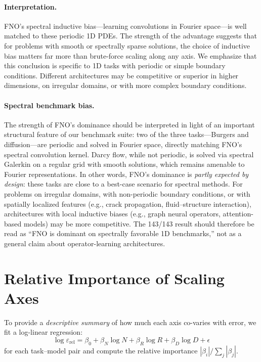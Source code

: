 \documentclass[11pt]{article}
\newcommand{\relLtwo}{\varepsilon_{\mathrm{rel}}}
\begin{document}
\paragraph{Interpretation.}
FNO's spectral inductive bias---learning convolutions in Fourier
space---is well matched to these periodic 1D PDEs. The strength of
the advantage suggests that for problems with smooth or spectrally
sparse solutions, the choice of inductive bias matters far more than
brute-force scaling along any axis.
We emphasize that this conclusion is specific to 1D tasks with
periodic or simple boundary conditions. Different architectures may
be competitive or superior in higher dimensions, on irregular
domains, or with more complex boundary conditions.

\paragraph{Spectral benchmark bias.}
\label{sec:spectral-bias}
The strength of FNO's dominance should be interpreted in light of an
important structural feature of our benchmark suite: two of the three
tasks---Burgers and diffusion---are periodic and solved in Fourier
space, directly matching FNO's spectral convolution kernel.
Darcy flow, while not periodic, is solved via spectral Galerkin on
a regular grid with smooth solutions, which remains amenable to
Fourier representations.
In other words, FNO's dominance is \emph{partly expected by design}:
these tasks are close to a best-case scenario for spectral methods.
For problems on irregular domains, with non-periodic boundary
conditions, or with spatially localized features (e.g., crack
propagation, fluid--structure interaction), architectures with local
inductive biases (e.g., graph neural operators, attention-based
models) may be more competitive.
The 143/143 result should therefore be read as ``FNO is dominant on
spectrally favorable 1D benchmarks,'' not as a general claim about
operator-learning architectures.


\section{Relative Importance of Scaling Axes}
\label{sec:importance}

To provide a \emph{descriptive summary} of how much each axis
co-varies with error, we fit a log-linear regression:
\begin{equation}
\label{eq:log-linear}
\log \relLtwo = \beta_0 + \beta_N \log N + \beta_R \log R
  + \beta_D \log D + \epsilon
\end{equation}
for each task--model pair and compute the relative importance
$|\beta_i| / \sum_j |\beta_j|$.
\end{document}
